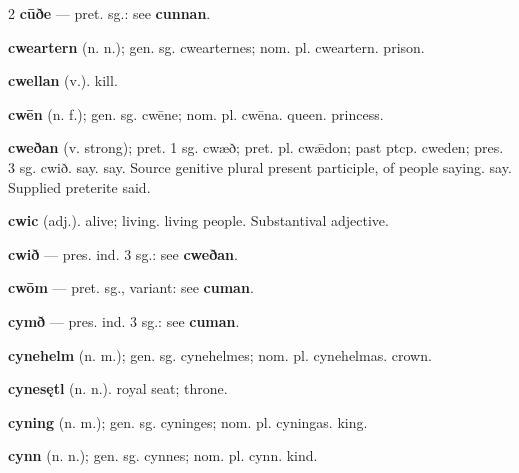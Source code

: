 \begin{multicols*}{2}
\textbf{cūðe} — pret. sg.: see \textbf{cunnan}.\par
\textbf{cweartern} (n. n.); gen. sg. cwearternes; nom. pl. cweartern. prison.\par
\textbf{cwellan} (v.). kill.\par
\textbf{cwēn} (n. f.); gen. sg. cwēne; nom. pl. cwēna. queen. princess.\par
\textbf{cweðan} (v. strong); pret. 1 sg. cwæð; pret. pl. cwǣdon; past ptcp. cweden; pres. 3 sg. cwið. say. say. Source genitive plural present participle, of people saying. say. Supplied preterite said.\par
\textbf{cwic} (adj.). alive; living. living people. Substantival adjective.\par
\textbf{cwið} — pres. ind. 3 sg.: see \textbf{cweðan}.\par
\textbf{cwōm} — pret. sg., variant: see \textbf{cuman}.\par
\textbf{cymð} — pres. ind. 3 sg.: see \textbf{cuman}.\par
\textbf{cynehelm} (n. m.); gen. sg. cynehelmes; nom. pl. cynehelmas. crown.\par
\textbf{cynesętl} (n. n.). royal seat; throne.\par
\textbf{cyning} (n. m.); gen. sg. cyninges; nom. pl. cyningas. king.\par
\textbf{cynn} (n. n.); gen. sg. cynnes; nom. pl. cynn. kind.\par

\end{multicols*}

